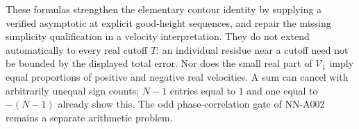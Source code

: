 These formulas strengthen the elementary contour identity by supplying a
verified asymptotic at explicit good-height sequences, and repair the
missing simplicity qualification in a velocity interpretation. They do
not extend automatically to every real cutoff $T$: an individual residue
near a cutoff need not be bounded by the displayed total error. Nor does
the small real part of $\mathcal V_1$ imply equal proportions of positive
and negative real velocities. A sum can cancel with arbitrarily unequal
sign counts; $N-1$ entries equal to $1$ and one equal to $-(N-1)$ already
show this. The odd phase-correlation gate of NN-A002 remains a separate
arithmetic problem.

